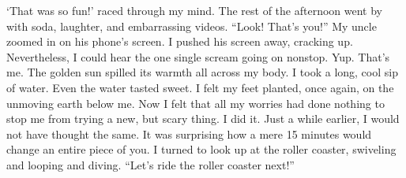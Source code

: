 \documentclass[12pt]{article}
\begin{document}
 ‘That was so fun!’  raced through my mind.  The rest of the afternoon went by with soda, laughter, and embarrassing videos.  “Look! That’s you!” My uncle zoomed in on his phone’s screen.  I pushed his screen  away, cracking up. Nevertheless, I could hear the one single scream going on nonstop.  Yup. That’s me.  The golden sun spilled its warmth all across my body. I took a long, cool sip of water.  Even the water tasted sweet. I felt my feet planted, once again, on the unmoving earth below me.  Now I felt that all my worries had done nothing to stop me from trying a new, but scary  thing. 
 I did it. 
 Just a while earlier, I would not have thought the same. It was surprising how a mere 15  minutes would change an entire piece of you.  I turned to look up at the roller coaster, swiveling and looping and diving.  “Let’s  ride the  roller coaster next!” 
\end{document}
